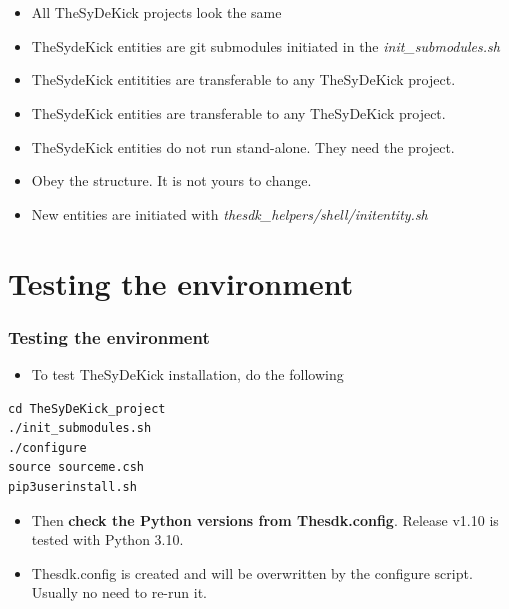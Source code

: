 \documentclass{sdkslides}
\begin{document}
\section*{\sectionname}
\begin{frame}[t,fragile]
    \frametitle{\sectionname} 
    \begin{itemize}
            \item All TheSyDeKick projects look the same
            \item TheSydeKick entities are git submodules initiated in the
                \emph{init\_submodules.sh}
            \item TheSydeKick entitities are transferable to any
                TheSyDeKick project.
            \item TheSydeKick entities are transferable to any
                TheSyDeKick project.
            \item TheSydeKick entities do not run stand-alone. They need the
                project.
            \item Obey the structure. It is not yours to change.
            \item New entities are initiated with
                \emph{thesdk\_helpers/shell/initentity.sh}
        \end{itemize}
\end{frame}


\renewcommand{\sectionname}{Testing the environment}
\section*{\sectionname}
\begin{frame}[t,fragile]
    \frametitle{\sectionname} 
    \begin{itemize}
            \item To test TheSyDeKick installation, do the following
        \end{itemize}
\begin{lstlisting}
cd TheSyDeKick_project
./init_submodules.sh     
./configure              
source sourceme.csh           
pip3userinstall.sh   
\end{lstlisting}
\begin{itemize}
    \item Then \textbf{check the Python versions from Thesdk.config}. Release
        v1.10 is tested with Python 3.10.
    \item Thesdk.config is created and will be overwritten by the configure
        script. Usually no need to re-run it. 
\end{itemize}

\end{frame}
\end{document}

